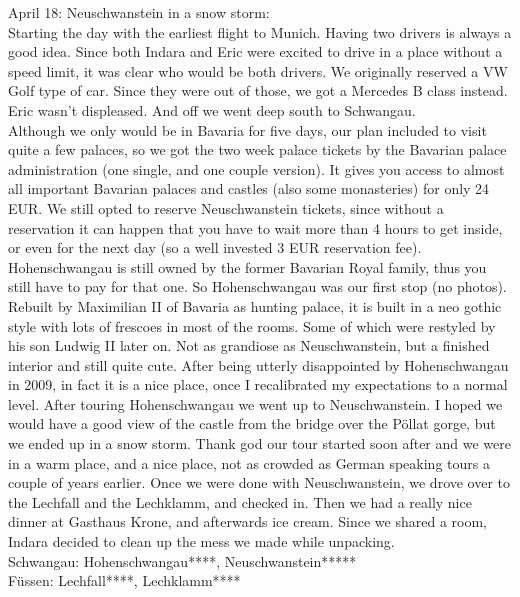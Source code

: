 April 18: Neuschwanstein in a snow storm:\\
Starting the day with the earliest flight to Munich. Having two drivers is always a good idea. Since both Indara and Eric were excited to drive in a place without a speed limit, it was clear who would be both drivers. We originally reserved a VW Golf type of car. Since they were out of those, we got a Mercedes B class instead. Eric wasn't displeased. And off we went deep south to Schwangau.\\
 Although we only would be in Bavaria for five days, our plan included to visit quite a few palaces, so we got the two week palace tickets by the Bavarian palace administration (one single, and one couple version). It gives you access to almost all important Bavarian palaces and castles (also some monasteries) for only 24 EUR. We still opted to reserve Neuschwanstein tickets, since without a reservation it can happen that you have to wait more than 4 hours to get inside, or even for the next day (so a well invested 3 EUR reservation fee). Hohenschwangau is still owned by the former Bavarian Royal family, thus you still have to pay for that one. So Hohenschwangau was our first stop (no photos). Rebuilt by Maximilian II of Bavaria as hunting palace, it is built in a neo gothic style with lots of frescoes in most of the rooms. Some of which were restyled by his son Ludwig II later on. Not as grandiose as Neuschwanstein, but a finished interior and still quite cute. After being utterly disappointed by Hohenschwangau in 2009, in fact it is a nice place, once I recalibrated my expectations to a normal level. After touring Hohenschwangau we went up to Neuschwanstein. I hoped we would have a good view of the castle from the bridge over the P\"ollat gorge, but we ended up in a snow storm. Thank god our tour started soon after and we were in a warm place, and a nice place, not as crowded as German speaking tours a couple of years earlier. Once we were done with Neuschwanstein, we drove over to the Lechfall and the Lechklamm, and checked in. Then we had a really nice dinner at Gasthaus Krone, and afterwards ice cream. Since we shared a room, Indara decided to clean up the mess we made while unpacking.\\

Schwangau: Hohenschwangau****, Neuschwanstein*****\\
F\"ussen: Lechfall****, Lechklamm****\\

